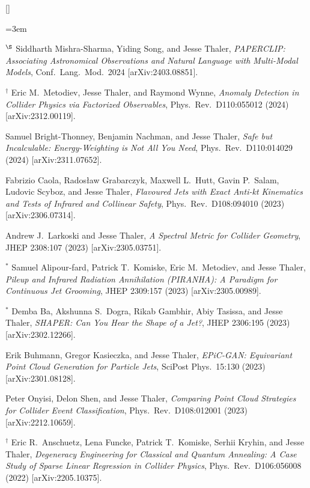\begin{list}{[]\addtocounter{jessecount}{-1}}{\leftmargin=3em \itemsep=4pt}
\item
${}^\S$ Siddharth Mishra-Sharma, Yiding Song, and Jesse Thaler,
\emph{PAPERCLIP: Associating Astronomical Observations and Natural Language with Multi-Modal Models},
Conf.\ Lang.\ Mod.\ 2024
[arXiv:2403.08851].

\item
${}^\dagger$ Eric M.\ Metodiev, Jesse Thaler, and Raymond Wynne,
\emph{Anomaly Detection in Collider Physics via Factorized Observables},
Phys.\ Rev.\ D110:055012 (2024)
[arXiv:2312.00119].

\item
 Samuel Bright-Thonney, Benjamin Nachman, and Jesse Thaler,
\emph{Safe but Incalculable: Energy-Weighting is Not All You Need},
Phys.\ Rev.\ D110:014029 (2024)
[arXiv:2311.07652].

\item
 Fabrizio Caola, Radosław Grabarczyk, Maxwell L.\ Hutt, Gavin P.\ Salam, Ludovic Scyboz, and Jesse Thaler,
\emph{Flavoured Jets with Exact Anti-kt Kinematics and Tests of Infrared and Collinear Safety},
Phys.\ Rev.\ D108:094010 (2023)
[arXiv:2306.07314].

\item
 Andrew J.\ Larkoski and Jesse Thaler,
\emph{A Spectral Metric for Collider Geometry},
JHEP 2308:107 (2023)
[arXiv:2305.03751].

\item
${}^\ast$ Samuel Alipour-fard, Patrick T.\ Komiske, Eric M.\ Metodiev, and Jesse Thaler,
\emph{Pileup and Infrared Radiation Annihilation (PIRANHA): A Paradigm for Continuous Jet Grooming},
JHEP 2309:157 (2023)
[arXiv:2305.00989].

\item
${}^\ast$ Demba Ba, Akshunna S.\ Dogra, Rikab Gambhir, Abiy Tasissa, and Jesse Thaler,
\emph{SHAPER: Can You Hear the Shape of a Jet?},
JHEP 2306:195 (2023)
[arXiv:2302.12266].

\item
 Erik Buhmann, Gregor Kasieczka, and Jesse Thaler,
\emph{EPiC-GAN: Equivariant Point Cloud Generation for Particle Jets},
SciPost Phys.\ 15:130 (2023)
[arXiv:2301.08128].

\item
 Peter Onyisi, Delon Shen, and Jesse Thaler,
\emph{Comparing Point Cloud Strategies for Collider Event Classification},
Phys.\ Rev.\ D108:012001 (2023)
[arXiv:2212.10659].

\item
${}^\dagger$ Eric R.\ Anschuetz, Lena Funcke, Patrick T.\ Komiske, Serhii Kryhin, and Jesse Thaler,
\emph{Degeneracy Engineering for Classical and Quantum Annealing: A Case Study of Sparse Linear Regression in Collider Physics},
Phys.\ Rev.\ D106:056008 (2022)
[arXiv:2205.10375].


\end{list}
